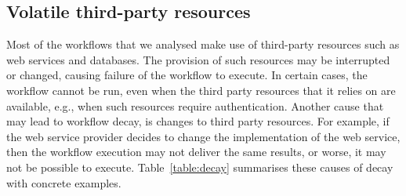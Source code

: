 

\subsection{Volatile third-party resources}
Most of the workflows that we analysed make use of third-party resources such as web services and databases.
The provision of such resources may be interrupted or changed, causing failure of the workflow to execute. In certain cases, the workflow cannot be run, even when the third party resources that it relies on are available, e.g.,  when such resources require authentication. Another cause that may lead to workflow decay, is changes to third party resources. For example, if the web service provider decides to change the implementation of the web service, then the workflow execution may not deliver the same results, or worse, it may not be possible to execute. Table~\ref{table:decay} summarises these causes of decay with concrete examples.


